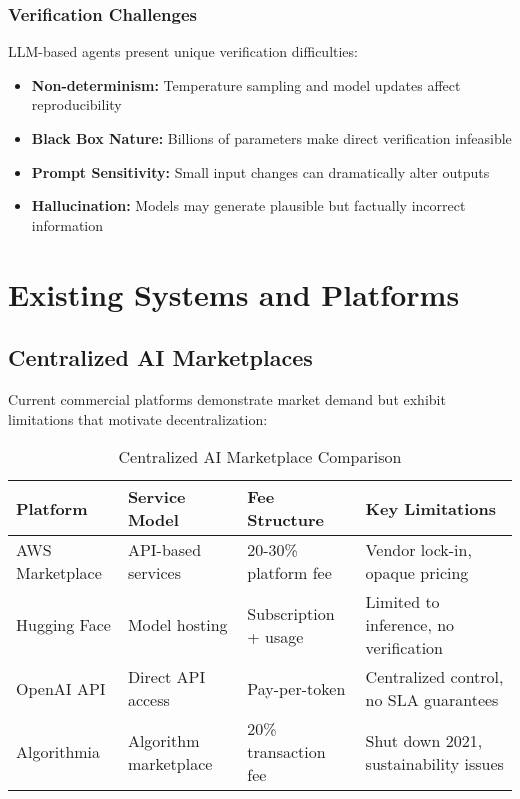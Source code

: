 \subsubsection{Verification Challenges}
LLM-based agents present unique verification difficulties:
\begin{itemize}
    \item \textbf{Non-determinism:} Temperature sampling and model updates affect reproducibility
    \item \textbf{Black Box Nature:} Billions of parameters make direct verification infeasible
    \item \textbf{Prompt Sensitivity:} Small input changes can dramatically alter outputs
    \item \textbf{Hallucination:} Models may generate plausible but factually incorrect information
\end{itemize}
\section{Existing Systems and Platforms}

\subsection{Centralized AI Marketplaces}

Current commercial platforms demonstrate market demand but exhibit limitations that motivate decentralization:

\begin{table}[h!]
\centering
\caption{Centralized AI Marketplace Comparison}
\label{tab:centralized-marketplaces}
\begin{tabular}{p{3cm}p{3cm}p{3cm}p{4cm}}
\toprule
\textbf{Platform} & \textbf{Service Model} & \textbf{Fee Structure} & \textbf{Key Limitations} \\
\midrule
AWS Marketplace & API-based services & 20-30\% platform fee & Vendor lock-in, opaque pricing \\
Hugging Face & Model hosting & Subscription + usage & Limited to inference, no verification \\
OpenAI API & Direct API access & Pay-per-token & Centralized control, no SLA guarantees \\
Algorithmia & Algorithm marketplace & 20\% transaction fee & Shut down 2021, sustainability issues \\
\bottomrule
\end{tabular}
\end{table}

